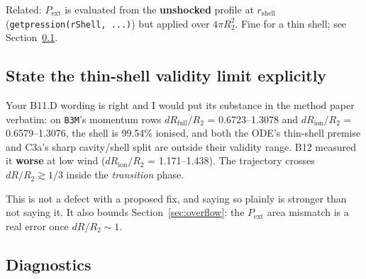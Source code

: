 \documentclass[11pt,a4paper,oneside]{report}
\newcommand{\brkus}{\textunderscore\allowbreak}
\newcommand{\code}[1]{\texttt{\small\let\_\brkus #1}}
\newcommand{\Pext}{P_{\mathrm{ext}}}
\newcommand{\up}[1]{\textcolor{tqaccent}{\textbf{#1}}}
\begin{document}
Related: $\Pext$ is evaluated from the \up{unshocked} profile at $r_{\mathrm{shell}}$
(\code{get\_press\_ion(rShell, ...)}) but applied over $4\pi R_2^2$. Fine for a thin shell;
see Section~\ref{sec:validity}.

\subsection{State the thin-shell validity limit explicitly}
\label{sec:validity}

Your B11.D wording is right and I would put its substance in the method paper verbatim: on
\code{B3M}'s momentum rows $dR_{\mathrm{full}}/R_2$ = 0.6723--1.3078 and
$dR_{\mathrm{ion}}/R_2$ = 0.6579--1.3076, the shell is 99.54\% ionised, and both the ODE's
thin-shell premise and C3a's sharp cavity/shell split are outside their validity range. B12
measured it \up{worse} at low wind ($dR_{\mathrm{ion}}/R_2$ = 1.171--1.438). The trajectory
crosses $dR/R_2\gtrsim1/3$ inside the \emph{transition} phase.

This is not a defect with a proposed fix, and saying so plainly is stronger than not saying
it. It also bounds Section~\ref{sec:overflow}: the $\Pext$ area mismatch is a real error once
$dR/R_2\sim1$.

\subsection{Diagnostics}
\label{sec:diag}
\end{document}
